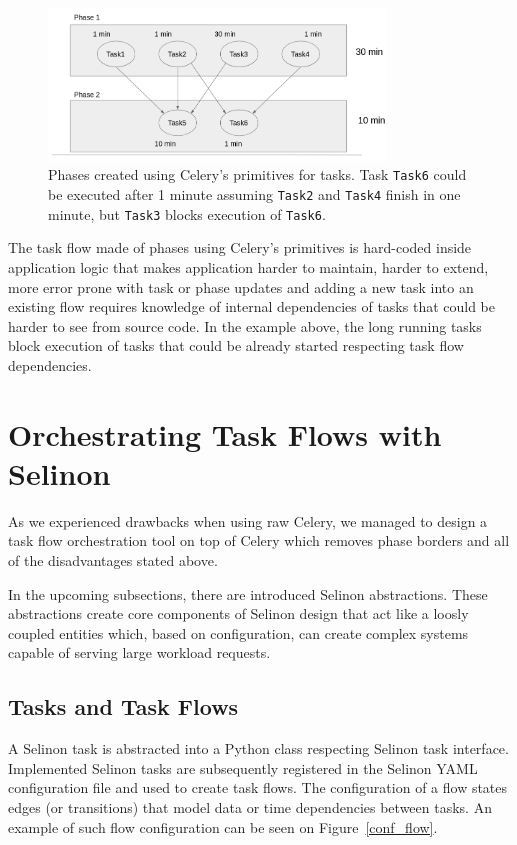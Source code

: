 \documentclass[a4paper]{llncs}
\begin{document}
\begin{figure}
  \centering
  \includegraphics[width=0.8\textwidth]{fig/flow1.png}
  \caption{Phases created using Celery's primitives for tasks. Task \texttt{Task6} could be executed after 1 minute assuming \texttt{Task2} and \texttt{Task4} finish in one minute, but \texttt{Task3} blocks execution of \texttt{Task6}.}
  \label{celery_phases}
\end{figure}

The task flow made of phases using Celery's primitives is hard-coded inside application logic that makes application harder to maintain, harder to extend, more error prone with task or phase updates and adding a new task into an existing flow requires knowledge of internal dependencies of tasks that could be harder to see from source code. In the example above, the long running tasks block execution of tasks that could be already started respecting task flow dependencies.

\section{Orchestrating Task Flows with Selinon}

As we experienced drawbacks when using raw Celery, we managed to design a task flow orchestration tool on top of Celery which removes phase borders and all of the disadvantages stated above.

In the upcoming subsections, there are introduced Selinon abstractions. These abstractions create core components of Selinon design that act like a loosly coupled entities which, based on configuration, can create complex systems capable of serving large workload requests.

\subsection{Tasks and Task Flows}

A Selinon task is abstracted into a Python class respecting Selinon task interface. Implemented Selinon tasks are subsequently registered in the Selinon YAML~\cite{ref_yaml} configuration file and used to create task flows. The configuration of a flow states edges (or transitions) that model data or time dependencies between tasks. An example of such flow configuration can be seen on Figure~\ref{conf_flow}.
\end{document}

